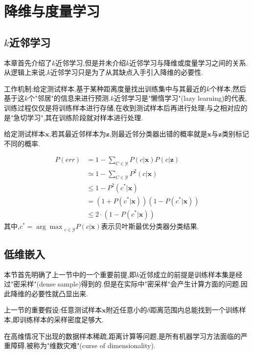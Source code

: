\chapter{降维与度量学习}

\section{$k$近邻学习}

本章首先介绍了$k$近邻学习,但是并未介绍$k$近邻学习与降维或度量学习之间的关系.从逻辑上来说,$k$近邻学习只是为了从其缺点入手引入降维的必要性.

工作机制:给定测试样本,基于某种距离度量找出训练集中与其最近的$k$个样本,然后基于这$k$个"邻居"的信息来进行预测.$k$近邻学习是"懒惰学习"(lazy learning)的代表,训练过程仅仅是将训练样本进行存储,在收到测试样本后再进行处理;与之相对应的是"急切学习",其在训练阶段就对样本进行处理.

给定测试样本$\mathbf{x}$,若其最近邻样本为$\mathbf{z}$,则最近邻分类器出错的概率就是$\mathbf{x}$与$\mathbf{z}$类别标记不同的概率.

\begin{equation}\begin{split}
P(err)&=1-\sum_{C\in\mathcal{Y}}P(c|\mathbf{x})P(c|\mathbf{z})\\&\simeq 1-\sum_{C\in\mathcal{Y}}P^2(c|\mathbf{x})\\&\le 1-P^2(c^\ast|\mathbf{x})\\&=(1+P(c^\ast|\mathbf{x}))(1-P(c^\ast|\mathbf{x}))\\&\le 2\cdot(1-P(c^\ast|\mathbf{x}))
\end{split}\end{equation}
其中,$c^\ast={\arg\max}_{c\in\mathcal{Y}}P(c|\mathbf{x})$表示贝叶斯最优分类器分类结果.

\section{低维嵌入}

本节首先明确了上一节中的一个重要前提,即$k$近邻成立的前提是训练样本集是经过"密采样"(dense sample)得到的.但是在实际中"密采样"会产生计算方面的问题.因此降维的必要性就凸显出来.

上一节的重要假设:任意测试样本$\mathbf{x}$附近任意小的$\delta$距离范围内总能找到一个训练样本,即训练样本的采样密度足够大.

在高维情况下出现的数据样本稀疏,距离计算等问题,是所有机器学习方法面临的严重障碍,被称为"维数灾难"(curse of dimensionality).

